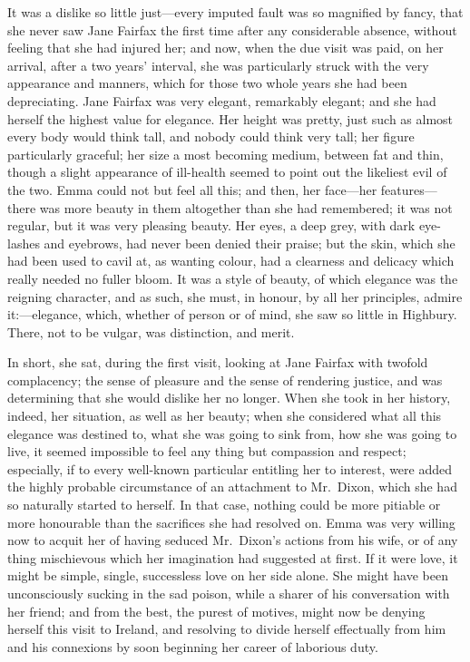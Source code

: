 It was a dislike so little just---every imputed fault was so magnified
by fancy, that she never saw Jane Fairfax the first time after any
considerable absence, without feeling that she had injured her;
and now, when the due visit was paid, on her arrival, after a two years'
interval, she was particularly struck with the very appearance
and manners, which for those two whole years she had been depreciating.
Jane Fairfax was very elegant, remarkably elegant; and she had
herself the highest value for elegance.  Her height was pretty,
just such as almost every body would think tall, and nobody could
think very tall; her figure particularly graceful; her size a most
becoming medium, between fat and thin, though a slight appearance
of ill-health seemed to point out the likeliest evil of the two.
Emma could not but feel all this; and then, her face---her features---%
there was more beauty in them altogether than she had remembered;
it was not regular, but it was very pleasing beauty.  Her eyes,
a deep grey, with dark eye-lashes and eyebrows, had never been denied
their praise; but the skin, which she had been used to cavil at,
as wanting colour, had a clearness and delicacy which really needed
no fuller bloom.  It was a style of beauty, of which elegance
was the reigning character, and as such, she must, in honour,
by all her principles, admire it:---elegance, which, whether of person
or of mind, she saw so little in Highbury.  There, not to be vulgar,
was distinction, and merit.

In short, she sat, during the first visit, looking at Jane Fairfax
with twofold complacency; the sense of pleasure and the sense
of rendering justice, and was determining that she would dislike
her no longer.  When she took in her history, indeed, her situation,
as well as her beauty; when she considered what all this elegance
was destined to, what she was going to sink from, how she was going
to live, it seemed impossible to feel any thing but compassion
and respect; especially, if to every well-known particular entitling
her to interest, were added the highly probable circumstance
of an attachment to Mr.\ Dixon, which she had so naturally started
to herself.  In that case, nothing could be more pitiable
or more honourable than the sacrifices she had resolved on.
Emma was very willing now to acquit her of having seduced
Mr.\ Dixon's actions from his wife, or of any thing mischievous
which her imagination had suggested at first.  If it were love,
it might be simple, single, successless love on her side alone.
She might have been unconsciously sucking in the sad poison,
while a sharer of his conversation with her friend; and from the best,
the purest of motives, might now be denying herself this visit
to Ireland, and resolving to divide herself effectually from
him and his connexions by soon beginning her career of laborious duty.

